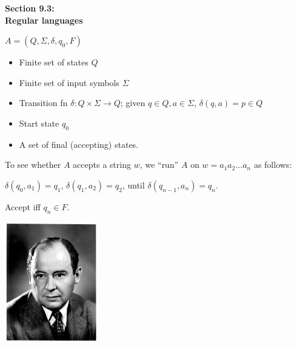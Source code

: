 
\newcommand{\mytitle}{Computational Foundations \\ Section 9.3}
\newcommand{\mychpnr}{9}


\begin{frame}
\begin{center}
\addtocounter{part}{1}
{\bf Section 9.3: \\ Regular languages}
\end{center}
\end{frame}

\begin{frame}

$A=(Q,\Sigma,\delta,q_0,F)$

\begin{itemize}
\item  Finite set of states $Q$
\item  Finite set of input symbols $\Sigma$
\item  Transition fn $\delta:Q\times\Sigma\longrightarrow Q$;
given $q\in Q,a\in\Sigma$, $\delta(q,a)=p\in Q$ 
\item  Start state $q_0$
\item  A set of final (accepting) states.
\end{itemize}

To see whether $A$ accepts a string
$w$, we ``run'' $A$ on $w=a_1a_2\ldots a_n$ as follows:

$\delta(q_0,a_1)=q_1$, $\delta(q_1,a_2)=q_2$, until
$\delta(q_{n-1},a_n)=q_n$.  

Accept iff $q_n\in F$.
\end{frame}

\begin{frame}
\begin{minipage}{5cm}
\includegraphics[width=4cm]{figures/JohnvonNeumann.jpg}
\end{minipage}
\begin{minipage}{5cm}
 \\
\end{minipage}
\end{frame}

